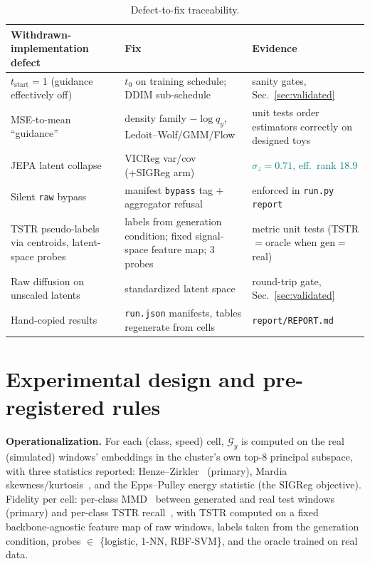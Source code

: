 \documentclass[11pt]{article}
\newcommand{\Gng}{\mathcal{G}}
\newcommand{\measured}[1]{\textcolor{teal}{#1}}
\newcommand{\code}[1]{\texttt{\small #1}}
\begin{document}
\begin{table}[h]\centering\small
\begin{tabular}{p{}p{}p{}}
\toprule
Withdrawn-implementation defect & Fix & Evidence\\
\midrule
$t_{\mathrm{start}}=1$ (guidance effectively off) & $t_0$ on training schedule; DDIM sub-schedule & sanity gates, Sec.~\ref{sec:validated}\\
MSE-to-mean ``guidance'' & density family $-\log q_y$, Ledoit--Wolf/GMM/Flow & unit tests order estimators correctly on designed toys\\
JEPA latent collapse & VICReg var/cov (+SIGReg arm) & \measured{$\sigma_z = 0.71$, eff.\ rank 18.9}\\
Silent \code{raw} bypass & manifest \code{bypass} tag + aggregator refusal & enforced in \code{run.py report}\\
TSTR pseudo-labels via centroids, latent-space probes & labels from generation condition; fixed signal-space feature map; 3 probes & metric unit tests (TSTR$=$oracle when gen$=$real)\\
Raw diffusion on unscaled latents & standardized latent space & round-trip gate, Sec.~\ref{sec:validated}\\
Hand-copied results & \code{run.json} manifests, tables regenerate from cells & \code{report/REPORT.md}\\
\bottomrule
\end{tabular}
\caption{Defect-to-fix traceability.}
\label{tab:fixes}
\end{table}

\section{Experimental design and pre-registered rules}
\label{sec:design}

\textbf{Operationalization.} For each (class, speed) cell,
$\Gng_y$ is computed on the real (simulated) windows' embeddings in the
cluster's own top-8 principal subspace, with three statistics reported:
Henze--Zirkler~\cite{henze1990class} (primary), Mardia
skewness/kurtosis~\cite{mardia1970measures}, and the Epps--Pulley energy
statistic (the SIGReg objective). Fidelity per cell: per-class
MMD~\cite{gretton2012kernel} between generated and real test windows
(primary) and per-class TSTR recall~\cite{esteban2017real}, with TSTR
computed on a fixed backbone-agnostic feature map of raw windows, labels
taken from the generation condition, probes $\in$ \{logistic, 1-NN,
RBF-SVM\}, and the oracle trained on real data.
\end{document}
